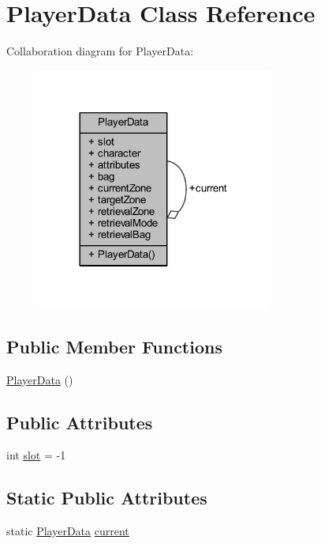 \hypertarget{class_player_data}{}\section{Player\+Data Class Reference}
\label{class_player_data}


Collaboration diagram for Player\+Data\+:\nopagebreak
\begin{figure}[H]
\begin{center}
\leavevmode
\includegraphics[width=221pt]{class_player_data__coll__graph}
\end{center}
\end{figure}
\subsection*{Public Member Functions}
\begin{DoxyCompactItemize}
\item 
\mbox{\hyperlink{class_player_data_a7dc81cafeb02f4843f6c6ec738323ad9}{Player\+Data}} ()
\end{DoxyCompactItemize}
\subsection*{Public Attributes}
\begin{DoxyCompactItemize}
\item 
int \mbox{\hyperlink{class_player_data_ad3b89e484ba4ff9a3dcc3a477af1453a}{slot}} = -\/1
\end{DoxyCompactItemize}
\subsection*{Static Public Attributes}
\begin{DoxyCompactItemize}
\item 
static \mbox{\hyperlink{class_player_data}{Player\+Data}} \mbox{\hyperlink{class_player_data_a56e50eb15fe325645f0a7206a53f3956}{current}}
\end{DoxyCompactItemize}
